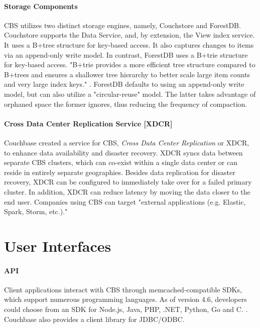 \documentclass[9pt,twocolumn,twoside]{styles/osajnl}
\begin{document}
\paragraph{Storage Components} CBS utilizes two distinct storage engines,
namely, Couchstore and ForestDB.  Couchstore supports the Data Service, and, by
extension, the View index service.  It uses a B+tree structure for key-based
access.  It also captures changes to items via an append-only write model. In
contrast, ForestDB uses a B+trie structure for key-based access.  "B+trie
provides a more efficient tree structure compared to B+trees and ensures a
shallower tree hierarchy to better scale large item counts and very large index
keys." \cite {www-bplustrie-cbsinc}.  ForestDB defaults to using an append-only
write model, but can also utilize a "circular-reuse" model.  The latter takes
advantage of orphaned space the former ignores, thus reducing the frequency of
compaction.

\paragraph{Cross Data Center Replication Service [XDCR]}
Couchbase created a service for CBS, \textit{Cross Data Center Replication} or XDCR, to enhance data availability and disaster recovery.  XDCR syncs data between separate CBS clusters, which can co-exist within a single data center or can reside in entirely separate geographies.  Besides data replication for disaster recovery, XDCR can be configured to immediately take over for a failed primary cluster.  In addition, XDCR can reduce latency by moving the data closer to the end user.  Companies using CBS can target "external applications (e.g. Elastic, Spark, Storm, etc.)."\cite{www-xdcr-cbsinc}

\section{User Interfaces}
\paragraph{API}
Client applications interact with CBS through memcached-compatible SDKs, which
support numerous programming languages.  As of version 4.6, developers could
choose from an SDK for Node.js, Java, PHP, .NET, Python, Go and C.
\cite{www-sdklist-cbsinc}.  Couchbase also provides a client library for JDBC/ODBC.\cite{www-downloads-cbsinc}
\end{document}
